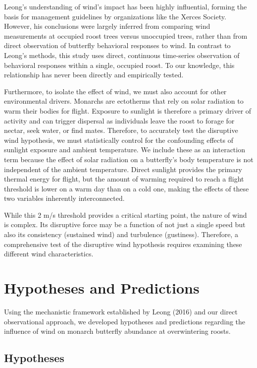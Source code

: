 Leong's understanding of wind's impact has been highly influential, forming the basis for management guidelines by organizations like the Xerces Society. However, his conclusions were largely inferred from comparing wind measurements at occupied roost trees versus unoccupied trees, rather than from direct observation of butterfly behavioral responses to wind. In contrast to Leong's methods, this study uses direct, continuous time-series observation of behavioral responses within a single, occupied roost. To our knowledge, this relationship has never been directly and empirically tested.

Furthermore, to isolate the effect of wind, we must also account for other environmental drivers. Monarchs are ectotherms that rely on solar radiation to warm their bodies for flight. Exposure to sunlight is therefore a primary driver of activity and can trigger dispersal as individuals leave the roost to forage for nectar, seek water, or find mates. Therefore, to accurately test the disruptive wind hypothesis, we must statistically control for the confounding effects of sunlight exposure and ambient temperature. We include these as an interaction term because the effect of solar radiation on a butterfly's body temperature is not independent of the ambient temperature. Direct sunlight provides the primary thermal energy for flight, but the amount of warming required to reach a flight threshold is lower on a warm day than on a cold one, making the effects of these two variables inherently interconnected.

While this 2 m/s threshold provides a critical starting point, the nature of wind is complex. Its disruptive force may be a function of not just a single speed but also its consistency (sustained wind) and turbulence (gustiness). Therefore, a comprehensive test of the disruptive wind hypothesis requires examining these different wind characteristics.

\section{Hypotheses and Predictions}

Using the mechanistic framework established by Leong (2016) and our direct observational approach, we developed hypotheses and predictions regarding the influence of wind on monarch butterfly abundance at overwintering roosts.

\subsection{Hypotheses}


